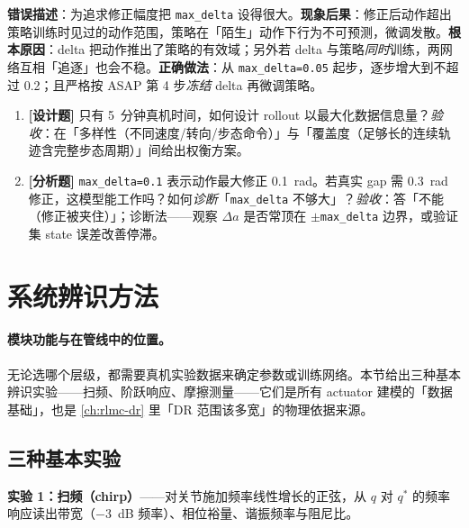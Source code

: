 \begin{pitfall}
\textbf{错误描述}：为追求修正幅度把 \verb|max_delta| 设得很大。\textbf{现象后果}：修正后动作超出策略训练时见过的动作范围，策略在「陌生」动作下行为不可预测，微调发散。\textbf{根本原因}：delta 把动作推出了策略的有效域；另外若 delta 与策略\emph{同时}训练，两网络互相「追逐」也会不稳。\textbf{正确做法}：从 \verb|max_delta=0.05| 起步，逐步增大到不超过 0.2；且严格按 ASAP 第 4 步\emph{冻结} delta 再微调策略。
\end{pitfall}

\begin{practice}[本节练习]
\begin{enumerate}
  \item \textbf{[设计题]} 只有 5~分钟真机时间，如何设计 rollout 以最大化数据信息量？\emph{验收}：在「多样性（不同速度/转向/步态命令）」与「覆盖度（足够长的连续轨迹含完整步态周期）」间给出权衡方案。
  \item \textbf{[分析题]} \verb|max_delta=0.1| 表示动作最大修正 0.1~rad。若真实 gap 需 0.3~rad 修正，这模型能工作吗？如何\emph{诊断}「\verb|max_delta| 不够大」？\emph{验收}：答「不能（修正被夹住）」；诊断法——观察 $\Delta a$ 是否常顶在 $\pm$\verb|max_delta| 边界，或验证集 state 误差改善停滞。
\end{enumerate}
\end{practice}

\section{系统辨识方法}
\label{sec:rlmc-act-sysid}

\paragraph{模块功能与在管线中的位置。}无论选哪个层级，都需要真机实验数据来确定参数或训练网络。本节给出三种基本辨识实验——扫频、阶跃响应、摩擦测量——它们是所有 actuator 建模的「数据基础」，也是 \cref{ch:rlmc-dr} 里「DR 范围该多宽」的物理依据来源。

\subsection{三种基本实验}
\label{sec:rlmc-act-sysid-three}

\textbf{实验 1：扫频（chirp）}——对关节施加频率线性增长的正弦，从 $q$ 对 $q^*$ 的频率响应读出带宽（$-3$~dB 频率）、相位裕量、谐振频率与阻尼比。

